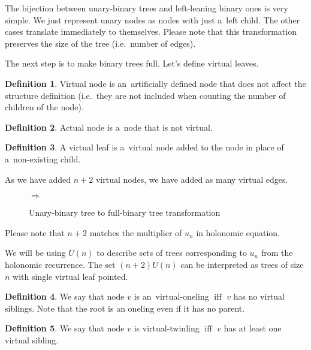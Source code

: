 \documentclass[final]{article}
\theoremstyle{definition}
\newtheorem{definition}{Definition}[subsection]
\theoremstyle{definition}
\theoremstyle{remark}
\DeclareMathOperator{\textiff}{\text{iff}}
\newcommand{\includeinlinesvg}[2]{\begin{minipage}{#1\textwidth}\end{minipage}}
\begin{document}
The bijection between unary-binary trees and left-leaning binary ones is very simple. We just represent unary nodes as nodes with just a~left child. The other cases translate immediately to themselves. Please note that this transformation preserves the size of the tree (i.e.~number of edges).

The next step is to make binary trees full. Let's define virtual leaves.

\begin{definition}
    Virtual node is an~artificially defined node that does not affect the structure definition (i.e.~they are not included when counting the number of children of the node).
\end{definition}

\begin{definition}
    Actual node is a~node that is not virtual.
\end{definition}

\begin{definition}
    A virtual leaf is a~virtual node added to the node in place of a~non-existing child.
\end{definition}

As we have added \(n + 2\) virtual nodes, we have added as many virtual edges.

\begin{figure}[H]
    \centering
    \includeinlinesvg{.2}{unary_binary__base}%
    \(\Rightarrow\)%
    \includeinlinesvg{.3}{unary_binary__full}
    \caption{Unary-binary tree to full-binary tree transformation}%
    \label{fig:unary_binary_transformation}
\end{figure}

Please note that \(n + 2\) matches the multiplier of \(u_n\) in holonomic equation.

We will be using \(U(n)\) to describe sets of trees corresponding to \(u_n\) from the holonomic recurrence. The set \((n + 2) U(n)\) can be interpreted as trees of size \(n\) with single virtual leaf pointed.

\begin{definition}
    We say that node \(v\) is an~virtual-oneling \(\textiff\) \(v\) has no virtual siblings. Note that the root is an oneling even if it has no parent.
\end{definition}

\begin{definition}
    We say that node \(v\) is virtual-twinling \(\textiff\) \(v\) has at least one virtual sibling.
\end{definition}
\end{document}
